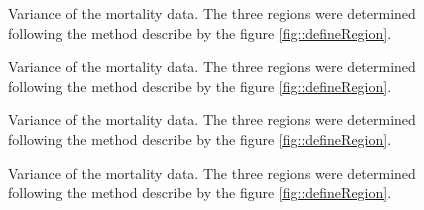 \documentclass[letterpaper, 12pt]{article}
\theoremstyle{theo}
\begin{document}
\begin{refsection}
\begin{onehalfspace}
\begin{figure}
	\centering
	
	\caption[Mortality variation, species 4--6]{Variance of the mortality data. The three regions were determined following the method describe by the figure \ref{fig::defineRegion}. \label{fig::mortalityVa4-6}}
\end{figure}

\begin{figure}
	\centering
	
	\caption[Mortality variation, species 7--9]{Variance of the mortality data. The three regions were determined following the method describe by the figure \ref{fig::defineRegion}. \label{fig::mortalityVa7-9}}
\end{figure}

\begin{figure}
	\centering
	
	\caption[Mortality variation, species 10--12]{Variance of the mortality data. The three regions were determined following the method describe by the figure \ref{fig::defineRegion}. \label{fig::mortalityVar10-12}}
\end{figure}

\begin{figure}
	\centering
	
	\caption[Mortality variation, species 13--14]{Variance of the mortality data. The three regions were determined following the method describe by the figure \ref{fig::defineRegion}. \label{fig::mortalityVar13-14}}
\end{figure}

\end{onehalfspace}

\clearpage
\printbibliography[heading=subbibliography]
\end{refsection}
\end{document}
